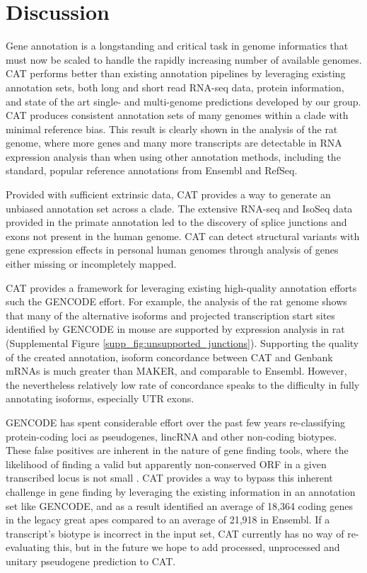 \documentclass[fleqn,10pt]{wlscirep}
\begin{document}
\section*{Discussion}
Gene annotation is a longstanding and critical task in genome informatics that must now be scaled to handle the rapidly increasing number of available genomes. CAT performs better than existing annotation pipelines by leveraging existing annotation sets, both long and short read RNA-seq data, protein information, and state of the art single- and multi-genome predictions developed by our group. CAT produces consistent annotation sets of many genomes within a clade with minimal reference bias. This result is clearly shown in the analysis of the rat genome, where more genes and many more transcripts are detectable in RNA expression analysis than when using other annotation methods, including the standard, popular reference annotations from Ensembl and RefSeq.

Provided with sufficient extrinsic data, CAT provides a way to generate an unbiased annotation set across a clade. The extensive RNA-seq and IsoSeq data provided in the primate annotation led to the discovery of splice junctions and exons not present in the human genome. CAT can detect structural variants with gene expression effects in personal human genomes through analysis of genes either missing or incompletely mapped.

CAT provides a framework for leveraging existing high-quality annotation efforts such the GENCODE effort. For example, the analysis of the rat genome shows that many of the alternative isoforms and projected transcription start sites identified by GENCODE in mouse are supported by expression analysis in rat (Supplemental Figure \ref{supp_fig:unsupported_junctions}). Supporting the quality of the created annotation, isoform concordance between CAT and Genbank mRNAs is much greater than MAKER, and comparable to Ensembl. However, the nevertheless relatively low rate of concordance speaks to the difficulty in fully annotating isoforms, especially UTR exons. 

GENCODE has spent considerable effort over the past few years re-classifying protein-coding loci as pseudogenes, lincRNA and other non-coding biotypes. These false positives are inherent in the nature of gene finding tools, where the likelihood of finding a valid but apparently non-conserved ORF in a given transcribed locus is not small \cite{lin2011phylocsf}. CAT provides a way to bypass this inherent challenge in gene finding by leveraging the existing information in an annotation set like GENCODE, and as a result identified an average of 18,364 coding genes in the legacy great apes compared to an average of 21,918 in Ensembl. If a transcript’s biotype is incorrect in the input set, CAT currently has no way of re-evaluating this, but in the future we hope to add processed, unprocessed and unitary pseudogene prediction to CAT.
\end{document}
